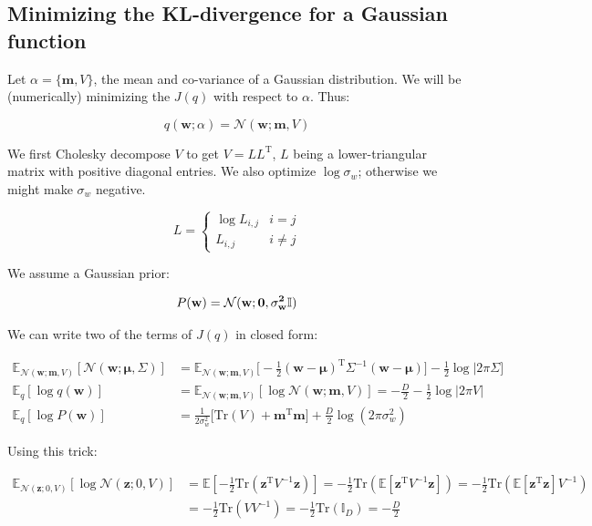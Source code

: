 \documentclass{article}
\newcommand{\bm}[1]{\mathbf{#1}}
\newcommand{\vf}[1]{\mathbf{#1}}
\newcommand{\normal}{\mathcal{N}}
\newcommand{\bz}{\vf{z}}
\newcommand{\bw}{\vf{w}}
\newcommand{\bmu}{\pmb{\mu}}
\newcommand{\tran}{\text{T}}
\newcommand{\expect}{\mathbb{E}}
\begin{document}
\subsection{Minimizing the KL-divergence for a Gaussian function}
Let $\alpha = \{ \bm{m}, V \}$, the mean and co-variance of a Gaussian distribution. We will be (numerically) minimizing the $J(q)$ with respect to $\alpha$. Thus:

\begin{equation*}
    q(\bw; \alpha) = \normal(\bw; \bm{m}, V)
\end{equation*}

We first Cholesky decompose $V$ to get $V = LL^\tran$, $L$ being a lower-triangular matrix with positive diagonal entries. We also optimize $\log \sigma_w$; otherwise we might make $\sigma_w$ negative.

\begin{equation*}
    L = \begin{cases}
        \log L_{i, j} & i = j \\
        L_{i, j}      & i \neq j
    \end{cases}
\end{equation*}

We assume a Gaussian prior:

\begin{equation*}
    P(\bw) = \normal(\bw; \bf{0}, \sigma_w^2 \mathbb{I})
\end{equation*}

We can write two of the terms of $J(q)$ in closed form:

\begin{align*}
    \expect_{\normal(\bw; \bm{m}, V)}[\normal(\bw; \bmu, \Sigma)] &=
        \expect_{\normal(\bw; \bm{m}, V)}\bigg[
            -\frac{1}{2}(\bw - \bmu)^\tran \Sigma^{-1} (\bw - \bmu)
        \bigg] - \frac{1}{2} \log |2 \pi \Sigma] \\
    \expect_q[\log q(\bw)] &=
        \expect_{\normal(\bw; \bm{m}, V)}[\log \normal(\bw; \bm{m}, V)] = -\frac{D}{2} - \frac{1}{2}\log|2 \pi V| \\
    \expect_q[\log P(\bw)] &=
        \frac{1}{2\sigma_w^2}\bigg[ \text{Tr}(V) + \bm{m}^\tran \bm{m} \bigg] + \frac{D}{2} \log(2\pi\sigma_w^2)
\end{align*}

Using this trick:

\begin{align*}
    \expect_{\normal(\bz; 0, V)}[\log \normal(\bz; 0, V)] &=
        \expect[-\frac{1}{2} \text{Tr}(\bz^\tran V^{-1} \bz)]
    = -\frac{1}{2} \text{Tr}(\expect[\bz^\tran V^{-1} \bz])
    = -\frac{1}{2} \text{Tr}(\expect[\bz^\tran \bz] V^{-1}) \\
    &= -\frac{1}{2} \text{Tr}(VV^{-1}) = -\frac{1}{2} \text{Tr}(\mathbb{I}_D) = -\frac{D}{2}
\end{align*}
\end{document}
